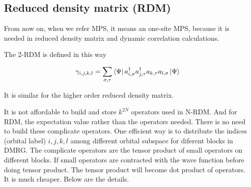 \subsection{Reduced density matrix (RDM)}


From now on, when we refer MPS, it means an one-site MPS, because it is needed in reduced density matrix and dynamic correlation calculations.

The 2-RDM is defined in this way

\begin{equation}
\gamma_{i,j,k,l}=\sum_{\sigma,\tau} \bra{\Psi}a^\dagger_{i,\sigma}a^\dagger_{j,\tau}a_{k,\tau}a_{l,\sigma}\ket{\Psi}
\end{equation}

It is similar for the higher order reduced density matrix.

%
%


It is not affordable to build and store $k^{2N}$ operators used in N-RDM.
And for RDM, the expectation value rather than the operators needed. There is no need to build these complicate operators.
One efficient way is to distribute the indices (orbital label) $i,j,k,l$ among different orbital subspace for diferent blocks in DMRG.\cite{ghosh_orbital_2008,zgid_density_2008} 
The complicate operators are the tensor product of small operators on different blocks. If small operators are contracted with the wave function before doing tensor product. The tensor product will become dot product of operators. It is much cheaper. Below are the details.

